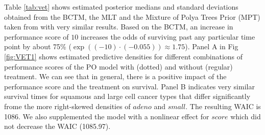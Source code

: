 \documentclass[12pt, a4paper]{article}
\begin{document}
Table \ref{tab:vet} shows estimated posterior medians and standard deviations obtained from the BCTM, the MLT and the Mixture of Polya Trees Prior (MPT) taken from \cite{hanson2007bayesian} with very similar results. Based on the BCTM, an increase in performance score of $10$ increases the odds of surviving past any particular time point by about 75\% ($\exp((-10) \cdot (-0.055)) \approx 1.75$). Panel A in Fig \ref{fig:VET1} shows estimated predictive densities for different combinations of performance scores of the PO model with (dotted) and without (regular) treatment. We can see that in general, there is a positive impact of the performance score and the treatment on survival. Panel B indicates very similar survival times for squamous and large cell cancer types that differ significantly frome the more right-skewed densities of $\mathit{adeno}$ and $\mathit{small}$. The resulting WAIC is 1086. We also supplemented the model with a nonlinear effect for $score$ which did not decrease the WAIC  (1085.97).
\end{document}
